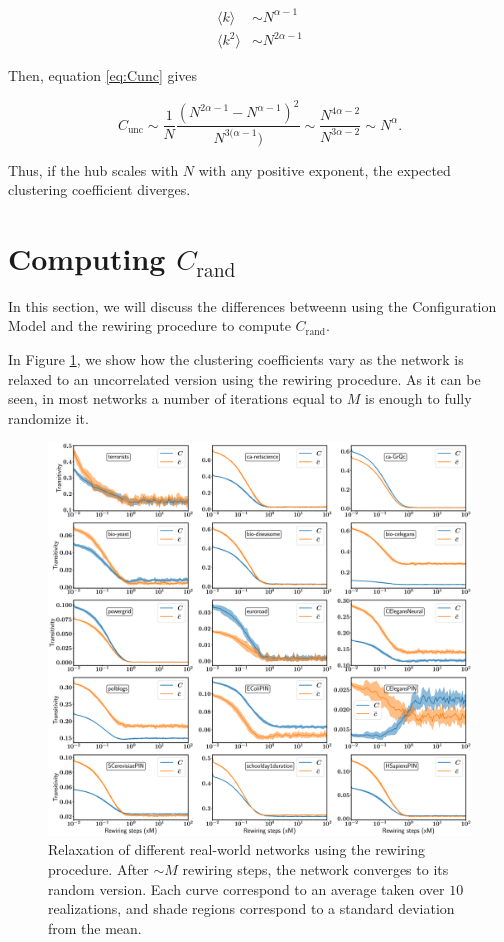 \documentclass{article}
\begin{document}
\begin{align}
    \langle k \rangle &\sim N^{\alpha - 1} \nonumber \\
    \langle k^2 \rangle &\sim N^{2\alpha-1} \nonumber 
\end{align}

Then, equation \ref{eq:Cunc} gives 

\begin{equation}
    C_{\mathrm{unc}} \sim \dfrac{1}{N} \dfrac{(N^{2\alpha-1} - N^{\alpha - 1})^2}{N^{3(\alpha - 1})} \sim \dfrac{N^{4\alpha-2}}{N^{3\alpha-2}} \sim N^{\alpha}.
\end{equation}

Thus, if the hub scales with $N$ with any positive exponent, the expected clustering coefficient diverges.

\section{Computing $C_{\mathrm{rand}}$}

In this section, we will discuss the differences betweenn using the Configuration Model and the rewiring procedure to compute $C_{\mathrm{rand}}$.

In Figure \ref{fig:relaxation}, we show how the clustering coefficients vary as the network is relaxed to an uncorrelated version using the rewiring procedure. As it can be seen, in most networks a number of iterations equal to $M$ is enough to fully randomize it. 

\begin{figure}[ht!]
\centering
\includegraphics[scale=0.26]{./figs/relaxation.pdf}
\caption{Relaxation of different real-world networks using the rewiring procedure. After $\sim M$ rewiring steps, the network converges to its random version. Each curve correspond to an average taken over $10$ realizations, and shade regions correspond to a standard deviation from the mean.}
\label{fig:relaxation}
\end{figure}
\end{document}
